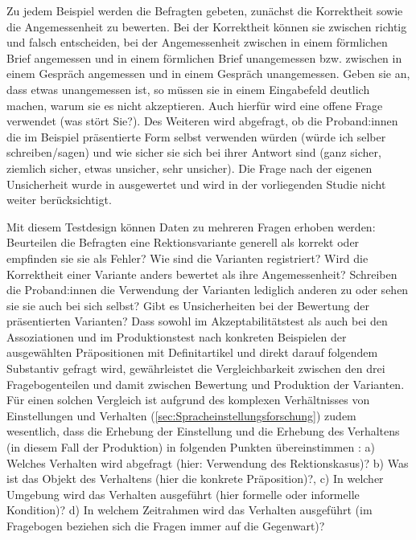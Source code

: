 Zu jedem Beispiel werden die Befragten gebeten, zunächst die Korrektheit sowie die Angemessenheit zu bewerten. 
Bei der Korrektheit können sie zwischen \glqq richtig\grqq{} und \glqq falsch\grqq{} entscheiden, bei der Angemessenheit zwischen \glqq in einem förmlichen Brief angemessen\grqq{} und \glqq in einem förmlichen Brief unangemessen\grqq{} bzw. zwischen \glqq in einem Gespräch angemessen\grqq{} und \glqq in einem Gespräch unangemessen\grqq. 
Geben sie an, dass etwas unangemessen ist, so müssen sie in einem Eingabefeld deutlich machen, warum sie es nicht akzeptieren. Auch hierfür wird eine offene Frage verwendet (\glqq was stört Sie?\grqq). 
Des Weiteren wird abgefragt, ob die Proband:innen die im Beispiel präsentierte Form selbst verwenden würden (\glqq würde ich selber schreiben/sagen\grqq) und wie sicher sie sich bei ihrer Antwort sind (\glqq ganz sicher, ziemlich sicher, etwas unsicher, sehr unsicher\grqq). 
Die Frage nach der eigenen Unsicherheit wurde in \citet{Vieregge.2019b} ausgewertet und wird in der vorliegenden Studie nicht weiter berücksichtigt. 

Mit diesem Testdesign können Daten zu mehreren Fragen erhoben werden: Beurteilen die Befragten eine Rektionsvariante generell als korrekt oder empfinden sie sie als Fehler? 
Wie sind die Varianten registriert? 
Wird die Korrektheit einer Variante anders bewertet als ihre Angemessenheit? 
Schreiben die Proband:innen die Verwendung der Varianten lediglich anderen zu oder sehen sie sie auch bei sich selbst? 
Gibt es Unsicherheiten bei der Bewertung der präsentierten Varianten? 
Dass sowohl im Akzeptabilitätstest als auch bei den Assoziationen und im Produktionstest nach konkreten Beispielen der ausgewählten Präpositionen mit Definitartikel und direkt darauf folgendem Substantiv gefragt wird, gewährleistet die Vergleichbarkeit zwischen den drei Fragebogenteilen und damit zwischen Bewertung und Produktion der Varianten. 
Für einen solchen Vergleich ist aufgrund des komplexen Verhältnisses von Einstellungen und Verhalten (\autoref{sec:Spracheinstellungsforschung}) zudem  wesentlich, dass die Erhebung der Einstellung und die Erhebung des Verhaltens (in diesem Fall der Produktion) in folgenden Punkten übereinstimmen \citep[s.][219]{Jonas.2014}: a) Welches Verhalten wird abgefragt (hier: Verwendung des Rektionskasus)? b) Was ist das Objekt des Verhaltens (hier die konkrete Präposition)?, c) In welcher Umgebung wird das Verhalten ausgeführt (hier formelle oder informelle Kondition)? d) In welchem Zeitrahmen wird das Verhalten ausgeführt (im Fragebogen beziehen sich die Fragen immer auf die Gegenwart)?

